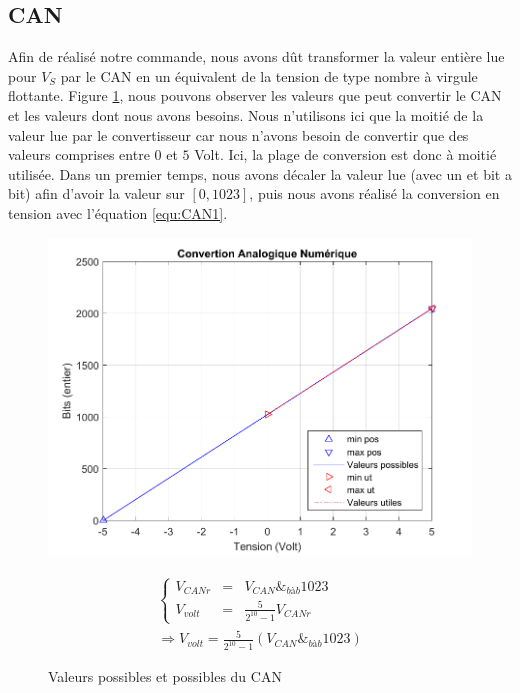 \subsection{CAN}
Afin de réalisé notre commande, nous avons dût transformer la valeur entière lue pour $V_S$ par le CAN en un équivalent de la tension de type nombre à virgule flottante.  Figure \ref{fig:CAN_p}, nous pouvons observer les valeurs que peut convertir le CAN et les valeurs dont nous avons besoins. Nous n'utilisons ici que la moitié de la valeur lue par le convertisseur car nous n'avons besoin de convertir que des valeurs comprises entre $0$ et $5$ Volt. Ici, la plage de conversion est donc à moitié utilisée. 
Dans un premier temps, nous avons décaler la valeur lue (avec un et bit a bit) afin d'avoir la valeur sur $\left[ 0 , 1023\right]$,  puis  nous avons réalisé la conversion en tension avec l'équation \ref{equ:CAN1}.
\begin{figure}[!ht]%
\begin{minipage}{.5\textwidth}%
\centering
\includegraphics[width=\textwidth]{./VI/images/CAN_plage.pdf}
\caption{\label{fig:CAN_p}Valeurs possibles et possibles du CAN}
\end{minipage}%
\hfill%
\begin{minipage}{.5\textwidth}%
\begin{equation}
\begin{array}{l}
\left\lbrace
\begin{array}{lcl}
\label{equ:CAN1}V_{CANr} &=& V_{CAN} \&_{bàb} 1023\\
V_{volt} &=& \frac{5}{2^{10}-1}V_{CANr}
\end{array}
\right.\\
\Rightarrow V_{volt} = \frac{5}{2^{10}-1}( V_{CAN} \&_{bàb} 1023)
\end{array}
\end{equation}
\end{minipage}%
\end{figure}



